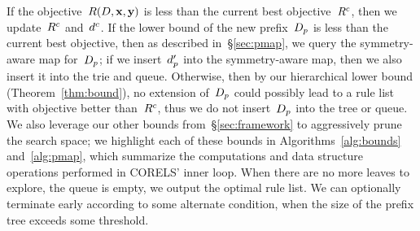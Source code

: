If the objective~$R({D}, \mathbf{x}, \mathbf{y})$ is less than the current best objective~${R^c}$,
then we update~${R^c}$ and~$d^c$.
%
If the lower bound of the new prefix~$D_p$ is less than the current best objective,
then as described in~\S\ref{sec:pmap}, we query the symmetry-aware map for~$D_p$;
if we insert~$d_p'$ into the symmetry-aware map, then we also insert it into the trie and queue.
%
Otherwise, %
then by our hierarchical lower bound (Theorem~\ref{thm:bound}),
no extension of~$D_p$ could possibly lead to a rule list with objective
better than~${R^c}$, thus we do not insert~$D_p$ into the tree or queue.
%
We also leverage our other bounds from~\S\ref{sec:framework}
to aggressively prune the search space; we highlight each of these bounds
in Algorithms~\ref{alg:bounds} and~\ref{alg:pmap},
which summarize the computations and data structure operations performed in CORELS' inner loop.
%
When there are no more leaves to explore, \ie the queue is empty, we output the optimal rule list.
%
We can optionally terminate early according to some alternate condition,
\eg when the size of the prefix tree exceeds some threshold.

